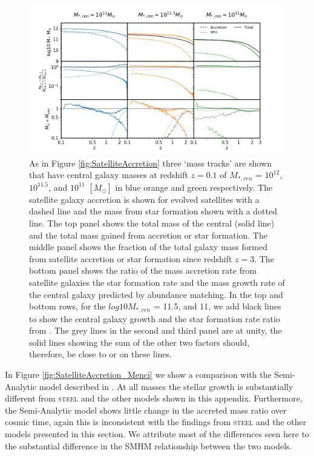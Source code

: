 \begin{figure}
    \centering
    \includegraphics[width = \linewidth]{Appendices/StellarMassAssembly/SatelliteAccretion_UniM.png}
    \caption{As in Figure \ref{fig:SatelliteAccretion} three `mass tracks' are shown that have central galaxy masses at redshift $z = 0.1$ of $M_{*,cen}$ = $10^{12}$, $10^{11.5}$, and $10^{11}$ $[M_{\odot}]$ in blue orange and green respectively. The satellite galaxy accretion is shown for evolved satellites with a dashed line and the mass from star formation shown with a dotted line. The top panel shows the total mass of the central (solid line) and the total mass gained from accretion or star formation. The middle panel shows the fraction of the total galaxy mass formed from satellite accretion or star formation since redshift $z=3$. The bottom panel shows the ratio of the mass accretion rate from satellite galaxies the star formation rate and the mass growth rate of the central galaxy predicted by abundance matching. In the top and bottom rows, for the $log 10 M_{*,cen}$ = 11.5, and 11, we add black lines to show the central galaxy growth and the star formation rate ratio from \citet{Behroozi2019UniverseMachine:010}. The grey lines in the second and third panel are at unity, the solid lines showing the sum of the other two factors should, therefore, be close to or on these lines.}
    \label{fig:SatelliteAccretion_UniM}
\end{figure}

In Figure \ref{fig:SatelliteAccretion_Menci} we show a comparison with the Semi-Analytic model described in \citet{Menci2014TriggeringInteractions}. At all masses the stellar growth is substantially different from \textsc{steel} and the other models shown in this appendix. Furthermore, the Semi-Analytic model shows little change in the accreted mass ratio over cosmic time, again this is inconsistent with the findings from \textsc{steel} and the other models presented in this section. We attribute most of the differences seen here to the substantial difference in the SMHM relationship between the two models.

